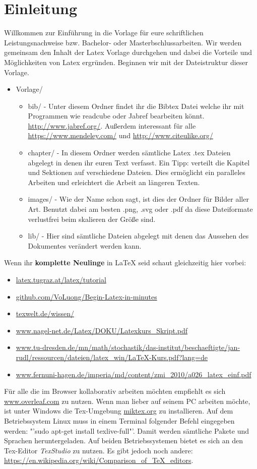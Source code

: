 \chapter{Einleitung}
Willkommen zur Einführung in die Vorlage für eure schriftlichen Leistungsnachweise bzw. Bachelor- oder Masterbschlussarbeiten. Wir werden gemeinsam den Inhalt der Latex Vorlage durchgehen und dabei die Vorteile und Möglichkeiten von Latex ergründen. Beginnen wir mit der Dateistruktur dieser Vorlage.

\begin{itemize}
	\item Vorlage/
		\begin{itemize}
			\item bib/ - Unter diesem Ordner findet ihr die Bibtex Datei welche ihr mit Programmen wie readcube oder Jabref bearbeiten könnt. \url{http://www.jabref.org/}. Außerdem interessant für alle \url{https://www.mendeley.com/} und \url{http://www.citeulike.org/}
			\item chapter/ - In diesem Ordner werden sämtliche Latex .tex Dateien abgelegt in denen ihr euren Text verfasst. Ein Tipp: verteilt die Kapitel und Sektionen auf verschiedene Dateien. Dies ermöglicht ein paralleles Arbeiten und erleichtert die Arbeit an längeren Texten.
			\item images/ - Wie der Name schon sagt, ist dies der Ordner für Bilder aller Art. Benutzt dabei am besten .png, .svg oder .pdf da diese Dateiformate verlustfrei beim skalieren der Größe sind.
			\item lib/ - Hier sind sämtliche Dateien abgelegt mit denen das Aussehen des Dokumentes verändert werden kann. 
		\end{itemize}
\end{itemize}

Wenn ihr \textbf{komplette Neulinge} in LaTeX seid schaut gleichzeitig hier vorbei:
\begin{itemize}
	\item \url{latex.tugraz.at/latex/tutorial}
	\item \url{github.com/VoLuong/Begin-Latex-in-minutes}
	\item \url{texwelt.de/wissen/}
	\item \url{www.nagel-net.de/Latex/DOKU/Latexkurs_Skript.pdf}
	\item \url{www.tu-dresden.de/mn/math/stochastik/das-institut/beschaeftigte/jan-rudl/ressourcen/dateien/latex_win/LaTeX-Kurs.pdf?lang=de}
	\item \url{www.fernuni-hagen.de/imperia/md/content/zmi_2010/a026_latex_einf.pdf}
\end{itemize} 
Für alle die im Browser kollaborativ arbeiten möchten empfiehlt es sich \url{www.overleaf.com} zu nutzen. Wenn man lieber auf seinem PC arbeiten möchte, ist unter Windows die Tex-Umgebung \url{miktex.org} zu installieren. Auf dem Betriebssystem Linux muss in einem Terminal folgender Befehl eingegeben werden: "'sudo apt-get install texlive-full"'. Damit werden sämtliche Pakete und Sprachen heruntergeladen. Auf beiden Betriebssystemen bietet es sich an den Tex-Editor \emph{TexStudio} zu nutzen. Es gibt jedoch noch andere: \url{https://en.wikipedia.org/wiki/Comparison_of_TeX_editors}.

